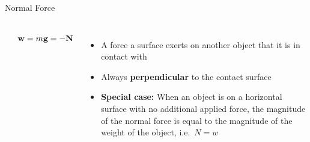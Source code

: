 \documentclass[12pt,compress,aspectratio=169]{beamer}
\newcommand{\mb}[1]{\ensuremath\mathbf{#1}}
\begin{document}
\begin{frame}{Normal Force}
  \begin{columns}
    \begin{center}
    \end{center}
    \begin{displaymath}
      \mb{w}=m\mb{g}=-\mb{N}
    \end{displaymath}
    
    \begin{itemize}
    \item A force a surface exerts on another object that it is in contact with
    \item Always \textbf{perpendicular} to the contact surface
    \item\textbf{Special case:} When an object is on a horizontal surface
      with no additional applied force, the magnitude of the normal force is
      equal to the magnitude of the weight of the object, i.e.\ $N=w$
    \end{itemize}
  \end{columns}
\end{frame}
\end{document}
